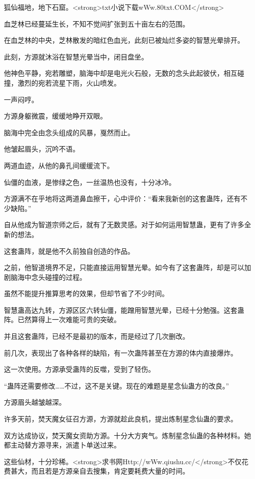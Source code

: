 
\begin{this_body}

狐仙福地，地下石窟。<strong>txt小说下载wWw.80txt.COM</strong>

血芝林已经蔓延生长，不知不觉间扩张到五十亩左右的范围。

在血芝林的中央，芝林散发的暗红色血光，此刻已被灿烂多姿的智慧光晕排开。

此刻，方源就沐浴在智慧光晕当中，闭目盘坐。

他神色平静，宛若雕塑，脑海中却是电光火石般，无数的念头此起彼伏，相互碰撞，激烈的宛若流星下雨，火山喷发。

一声闷哼。

方源身躯微震，缓缓地睁开双眼。

脑海中完全由念头组成的风暴，戛然而止。

他皱起眉头，沉吟不语。

两道血迹，从他的鼻孔间缓缓流下。

仙僵的血液，是惨绿之色，一丝温热也没有，十分冰冷。

方源满不在乎地将这两道鼻血擦干，心中评价：“看来我新创的这套蛊阵，还有不少缺陷。”

自从他成为智道宗师之后，就有了无数灵感。对于如何运用智慧蛊，更有了许多全新的想法。

这套蛊阵，就是他不久前独自创造的作品。

之前，他智道境界不足，只能直接运用智慧光晕。如今有了这套蛊阵，却是可以加剧脑海中念头碰撞的过程。

虽然不能提升推算思考的效果，但却节省了不少时间。

智慧蛊高达九转，方源区区六转仙僵，能蹭用智慧光晕，已经十分勉强。这套蛊阵。已然算得上一次难能可贵的突破。

并且这套蛊阵，已经不是最初的版本，而是经过了几次删改。

前几次，表现出了各种各样的缺陷，有一次蛊阵甚至在方源的体内直接爆炸。

这一次使用。方源承受蛊阵的反噬，受到了轻伤。

“蛊阵还需要修改……不过，这不是关键。现在的难题是星念仙蛊方的改良。”

方源眉头越皱越深。

许多天前，焚天魔女征召方源，方源就趁此良机，提出炼制星念仙蛊的要求。

双方达成协议，焚天魔女资助方源。十分大方爽气。炼制星念仙蛊的各种材料。她都主动替方源寻来，派遣卜单送过来。

这些仙材，十分珍稀。<strong>求书网Http://wWw.qiushu.cc/</strong>不仅花费甚大，而且若是方源亲自去搜集，肯定要耗费大量的时间。


\end{this_body}
